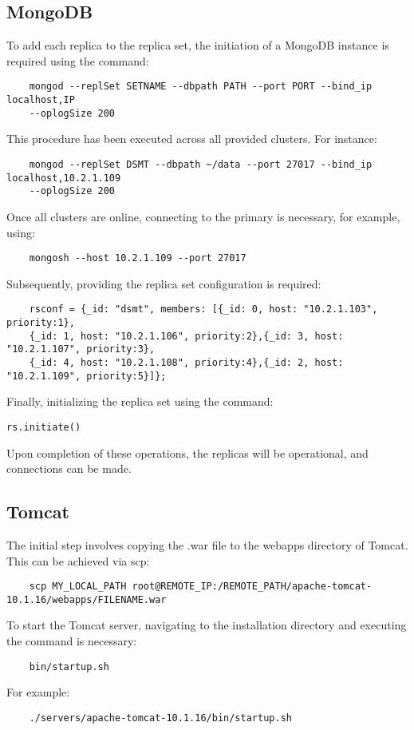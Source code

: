 \subsection{MongoDB}
To add each replica to the replica set, the initiation of a MongoDB instance is required using the command:
\begin{verbatim}
    mongod --replSet SETNAME --dbpath PATH --port PORT --bind_ip localhost,IP 
    --oplogSize 200
\end{verbatim}
This procedure has been executed across all provided clusters. For instance:
\begin{verbatim}
    mongod --replSet DSMT --dbpath ~/data --port 27017 --bind_ip localhost,10.2.1.109 
    --oplogSize 200
\end{verbatim}
Once all clusters are online, connecting to the primary is necessary, for example, using:
\begin{verbatim}
    mongosh --host 10.2.1.109 --port 27017
\end{verbatim}
Subsequently, providing the replica set configuration is required:
\begin{verbatim}
    rsconf = {_id: "dsmt", members: [{_id: 0, host: "10.2.1.103", priority:1},
    {_id: 1, host: "10.2.1.106", priority:2},{_id: 3, host: "10.2.1.107", priority:3},
    {_id: 4, host: "10.2.1.108", priority:4},{_id: 2, host: "10.2.1.109", priority:5}]};
\end{verbatim}
Finally, initializing the replica set using the command:
\begin{verbatim}
rs.initiate()
\end{verbatim}
Upon completion of these operations, the replicas will be operational, and connections can be made.

\subsection{Tomcat}
The initial step involves copying the .war file to the webapps directory of Tomcat. This can be achieved via scp:
\begin{verbatim}
    scp MY_LOCAL_PATH root@REMOTE_IP:/REMOTE_PATH/apache-tomcat-10.1.16/webapps/FILENAME.war
\end{verbatim}
To start the Tomcat server, navigating to the installation directory and executing the command is necessary:
\begin{verbatim}
    bin/startup.sh
\end{verbatim}
For example:
\begin{verbatim}
    ./servers/apache-tomcat-10.1.16/bin/startup.sh
\end{verbatim}

